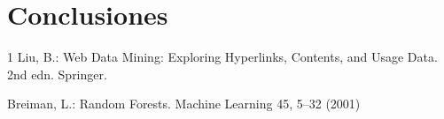 \documentclass{llncs}
\begin{document}
\section{Conclusiones}

\begin{thebibliography}{1}
Liu, B.: Web Data Mining: Exploring Hyperlinks, Contents, and Usage Data. 2nd edn. Springer.

Breiman, L.: Random Forests. Machine Learning 45, 5--32 (2001)
\end{thebibliography}
\end{document}

